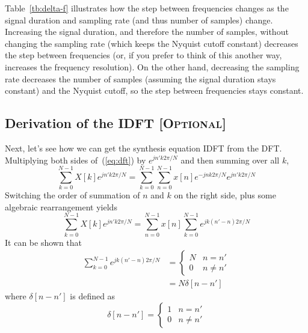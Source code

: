 Table~\ref{tb:delta-f} illustrates how the step between frequencies
changes as the signal duration and sampling rate (and thus number of
samples) change. Increasing the signal duration, and therefore the
number of samples, without changing the sampling rate (which keeps the
Nyquist cutoff constant) decreases the step between frequencies (or,
if you prefer to think of this another way, increases the frequency
resolution). On the other hand, decreasing the sampling rate decreases
the number of samples (assuming the signal duration stays constant)
and the Nyquist cutoff, so the step between frequencies stays
constant.

\subsection{Derivation of the IDFT [\textsc{Optional}]}

Next, let's see how we can get the synthesis equation IDFT from the
DFT. Multiplying both sides of~(\ref{eq:dft}) by $e^{j n' k 2\pi/N}$
and then summing over all $k$,
\begin{equation}
\sum_{k=0}^{N-1} X[k] e^{j n' k 2\pi/N} 
= \sum_{k=0}^{N-1}\sum_{n=0}^{N-1} x[n] e^{-j n k 2\pi/N}e^{j n' k
2\pi/N} 
\end{equation}
Switching the order of summation of $n$ and $k$ on the right side,
plus some algebraic rearrangement yields
\begin{equation}
\sum_{k=0}^{N-1} X[k] e^{j n' k 2\pi/N}
= \sum_{n=0}^{N-1} x[n] \sum_{k=0}^{N-1} e^{j k(n'-n)
2\pi/N}
\label{eq:dft-2idft1}
\end{equation}
It can be shown that
\begin{align}
\sum_{k=0}^{N-1} e^{j k(n'-n)2\pi/N} 
&= \left\{\begin{array}{ll}
                        N & n=n' \\
                        0 & n \neq n'
           \end{array}\right.\\
&= N\delta[n-n']
\end{align}
where $\delta[n-n']$ is defined as
\begin{equation}
\delta[n-n'] = \left\{\begin{array}{ll}
                        1 & n=n' \\
                        0 & n \neq n'
                      \end{array}\right.
\end{equation}

